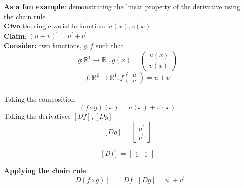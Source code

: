 \begin{framed}
\textbf{As a fun example}: demonstrating the linear property of the derivative using the chain rule \\

\textbf{Give} the single variable functions $u(x), v(x)$  \\

\textbf{Claim}: $(u + v) ^{\prime} = u ^{\prime} + v ^{\prime}$ \\

\textbf{Consider:} two functions, $g, f$ such that  \[
  g : \mathbb{R}^1 \to \mathbb{R}^2, g(x) = \begin{pmatrix} u(x) \\ v(x) \end{pmatrix} 
\]
\[
  f: \mathbb{R}^2 \to \mathbb{R}^1, f \begin{pmatrix} u \\ v \end{pmatrix} = u + v
\]  \\

Taking the composition 
\[
   (f \circ g)(x) = u(x) + v(x)
\] 
Taking the derivatives $\left[ D f \right]_{} , \left[ D g \right]_{}$ \[
  \left[ D g \right]_{}  = \begin{bmatrix} 
    u ^{\prime} \\ v ^{\prime}  
  \end{bmatrix}
\] 

\[
  \left[ D f \right]_{} = \begin{bmatrix} 
     1 & 1  
  \end{bmatrix}
\] 

\textbf{Applying the chain rule}: \[
  \left[ D (f \circ g) \right]_{} = \left[ D f \right]_{} \left[ D g \right]_{} = u ^{\prime} + v ^{\prime}
\] 
\end{framed}


